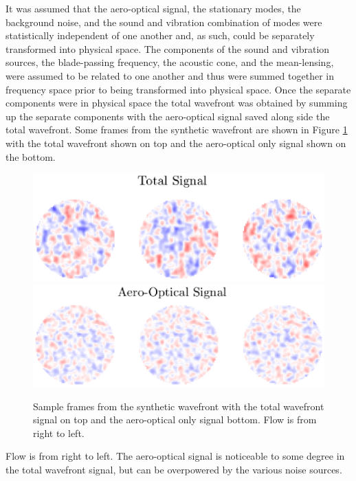 It was assumed that the aero-optical signal, the stationary modes, the background noise, and the sound and vibration combination of modes were statistically independent of one another and, as such, could be separately transformed into physical space.
The components of the sound and vibration sources, the blade-passing frequency, the acoustic cone, and the mean-lensing, were assumed to be related to one another and thus were summed together in frequency space prior to being transformed into physical space.
Once the separate components were in physical space the total wavefront was obtained by summing up the separate components with the aero-optical signal saved along side the total wavefront.
Some frames from the synthetic wavefront are shown in Figure \ref{fig:05_synthetic_frames} with the total wavefront shown on top and the aero-optical only signal shown on the bottom.
\begin{figure}
 \centering
 \includegraphics{../matlab/05_synthetic_wavefront/synthetic_frames_total.eps}
 \includegraphics{../matlab/05_synthetic_wavefront/synthetic_frames_ao.eps}
 \caption{Sample frames from the synthetic wavefront with the total wavefront signal on top and the aero-optical only signal bottom.  Flow is from right to left.}
 \label{fig:05_synthetic_frames}
\end{figure}
Flow is from right to left.
The aero-optical signal is noticeable to some degree in the total wavefront signal, but can be overpowered by the various noise sources.

